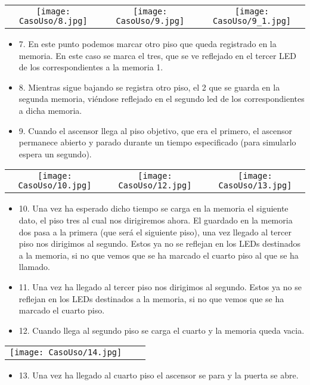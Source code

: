 	\begin{table}[H]
	\centering
	\begin{tabular}{ccc}
		 \texttt{[image: CasoUso/8.jpg]}   &
		 \texttt{[image: CasoUso/9.jpg]} &
		 \texttt{[image: CasoUso/9\_1.jpg]}  \\
	\end{tabular}
	\end{table}
	
	\begin{itemize}
	    \item 7. En este punto podemos marcar otro piso que queda registrado en la memoria. En este caso se marca el tres, que se ve reflejado en el tercer LED de los correspondientes a la memoria 1.	
	    \item 8. Mientras sigue bajando se registra otro piso, el 2 que se guarda en la segunda memoria, viéndose reflejado en el segundo led de los correspondientes a dicha memoria.	
	    \item 9. Cuando el ascensor llega al piso objetivo, que era el primero, el ascensor permanece abierto y parado durante un tiempo especificado (para simularlo espera un segundo).
	\end{itemize}
	
	\begin{table}[H]
	\centering
	\begin{tabular}{ccc}
		 \texttt{[image: CasoUso/10.jpg]}  &
		 \texttt{[image: CasoUso/12.jpg]}   &
		 \texttt{[image: CasoUso/13.jpg]}  \\ 
	\end{tabular}
	\end{table}
	\begin{itemize}
	    \item 10.  Una vez ha esperado dicho tiempo se carga en la memoria el siguiente dato, el piso tres al cual nos dirigiremos ahora. El guardado en la memoria dos pasa a la primera (que será el siguiente piso), una vez llegado al tercer piso nos dirigimos al segundo. Estos ya no se reflejan en los LEDs destinados a la memoria, si no que vemos que se ha marcado el cuarto piso al que se ha llamado.
	    \item 11.  Una vez ha llegado al tercer piso nos dirigimos al segundo. Estos ya no se reflejan en los LEDs destinados a la memoria, si no que vemos que se ha marcado el cuarto piso.
	    \item 12. Cuando llega al segundo piso se carga el cuarto y la memoria queda vacia.
	\end{itemize}
	
	\begin{table}[H]
	\centering
	\begin{tabular}{ccc}
		 \texttt{[image: CasoUso/14.jpg]}   &  &  \\
	\end{tabular}
	\end{table}
	
	\begin{itemize}
	    \item 13. Una vez ha llegado al cuarto piso el ascensor se para y la puerta se abre.
	\end{itemize}